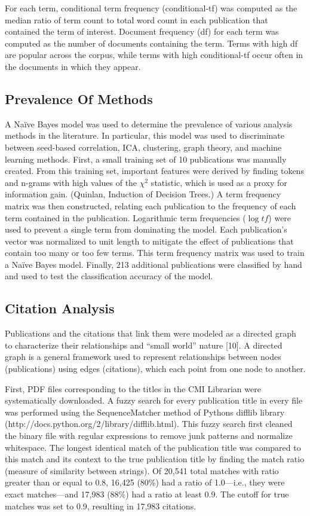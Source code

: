 \documentclass[12pt,3p]{elsarticle}
\begin{document}
For each term, conditional term frequency (conditional-tf) was computed as the
median ratio of term count to total word count in each publication that
contained the term of interest. Document frequency (df) for each term was
computed as the number of documents containing the term. Terms with high df are
popular across the corpus, while terms with high conditional-tf occur often in
the documents in which they appear.  

\subsection{Prevalence Of Methods} 
A Na\"ive Bayes model was used to determine the prevalence of various analysis methods in
the literature. In particular, this model was used to discriminate between
seed-based correlation, ICA, clustering, graph theory, and machine learning
methods. First, a small training set of 10 publications was manually created.
From this training set, important features were derived by finding tokens and
n-grams with high values of the $\chi^2$ statistic, which is used as a proxy
for information gain. (Quinlan, Induction of Decision Trees.) A term frequency
	matrix was then constructed, relating each publication to the frequency
	of each term contained in the publication. Logarithmic term frequencies
	($\log{t\!f}$) were used to prevent a single term from dominating the model.
	Each publication’s vector was normalized to unit length to mitigate the
	effect of publications that contain too many or too few terms. This term
	frequency matrix was used to train a Na\"ive Bayes model. Finally, 213
	additional publications were classified by hand and used to test the
	classification accuracy of the model.

\subsection{Citation Analysis}
Publications and the citations that link them were modeled as a directed graph
to characterize their relationships and ``small world'' nature [10]. A directed
graph is a general framework used to represent relationships between nodes
(publications) using edges (citations), which each point from one node to
another.

First, PDF files corresponding to the titles in the CMI Librarian were
systematically downloaded. A fuzzy search for every publication title in every
file was performed using the SequenceMatcher method of Pythons difflib library
(http://docs.python.org/2/library/difflib.html). This fuzzy search first cleaned
the binary file with regular expressions to remove junk patterns and normalize
whitespace. The longest identical match of the publication title was compared
to this match and its context to the true publication title by finding the match
ratio (measure of similarity between strings). Of 20,541 total matches with
ratio greater than or equal to 0.8, 16,425 (80\%) had a ratio of 1.0—i.e., they
were exact matches—and 17,983 (88\%) had a ratio at least 0.9. The cutoff for
true matches was set to 0.9, resulting in 17,983 citations. 
\end{document}
